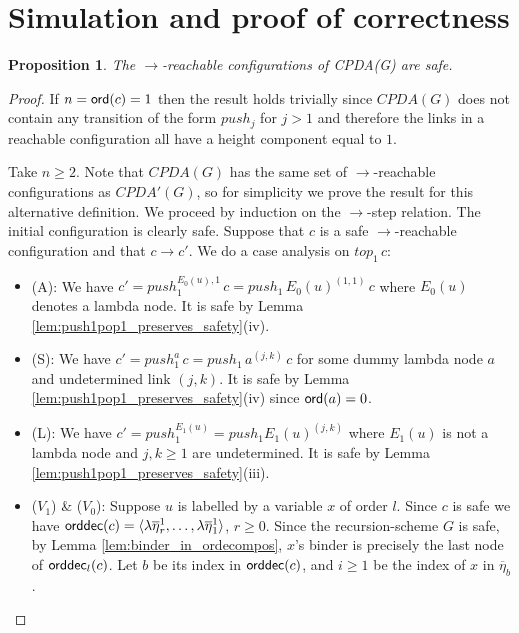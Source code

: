 \documentclass[a4paper,draft]{article}
\newtheorem{proposition}{Proposition}[section]
\theoremstyle{remark}
\theoremstyle{definition}
\newcommand\orddec{{\sf orddec}}
\begin{document}
\section{Simulation and proof of correctness}
\begin{proposition}
The $\rightarrow$-reachable configurations of CPDA(G) are safe.
\end{proposition}
\begin{proof}
If $n ={\sf ord}(c) =1$ then the result holds trivially since $CPDA(G)$ does not contain
any transition of the form $push_j$ for $j>1$ and therefore the links in a reachable configuration all have a height component equal to $1$.

Take $n\geq 2$. Note that $CPDA(G)$ has the same set of $\rightarrow$-reachable configurations
as $CPDA'(G)$, so for simplicity we prove the result for this alternative definition. We proceed by induction on the $\rightarrow$-step relation. The initial configuration is clearly safe.
Suppose that $c$ is a safe $\rightarrow$-reachable configuration and that
$c \rightarrow c'$. We do a case analysis on $top_1\,c$:
\begin{itemize}
\item (A): We have $c'=push_1^{E_0(u),1}\,c =push_1\,E_0(u)^{(1,1)}\,c$ where $E_0(u)$ denotes a lambda node. It is safe by Lemma \ref{lem:push1pop1_preserves_safety}(iv).

\item (S):
We have $c' = push_1^{a}\,c = push_1\,a^{(j,k)}\,c$ for some dummy lambda node $a$
and undetermined link $(j,k)$. It is safe by Lemma \ref{lem:push1pop1_preserves_safety}(iv) since ${\sf ord}(a) = 0$.

\item (L): We have $c' = push_1^{E_1(u)} = push_1 E_1(u)^{(j,k)}$ where $E_1(u)$ is not a lambda node
 and $j,k\geq1$ are undetermined. It is safe by Lemma \ref{lem:push1pop1_preserves_safety}(iii).

\item ($V_1$) \& ($V_0$): Suppose $u$ is labelled by a variable $x$ of order $l$.
Since $c$ is safe we have $\orddec(c) = \langle \lambda\overline\eta_r^1 , \ldots, \lambda\overline\eta_1^1
\rangle$, $r\geq 0$. Since the recursion-scheme $G$ is safe, by Lemma \ref{lem:binder_in_ordecompos}, $x$'s binder is precisely the last node of $\orddec_l(c)$. Let $b$ be its index in $\orddec(c)$, and $i\geq 1$ be the index of $x$ 
in $\overline\eta_b$.



\end{itemize}
\end{proof}
\end{document}
